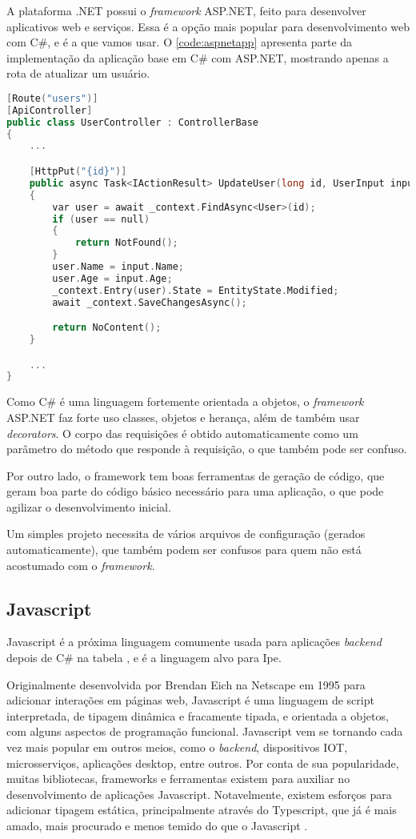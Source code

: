 A plataforma .NET possui o \textit{framework} ASP.NET, feito para desenvolver
aplicativos web e serviços. Essa é a opção mais popular para desenvolvimento web
com C\#, e é a que vamos usar. O \autoref{code:aspnetapp} apresenta parte da implementação
da aplicação base em C\# com ASP.NET, mostrando apenas a rota de atualizar um
usuário.

\begin{lstlisting}[language=C++,label={code:aspnetapp},caption={Aplicação base em C\# com ASP.NET}]
[Route("users")]
[ApiController]
public class UserController : ControllerBase
{
    ...

    [HttpPut("{id}")]
    public async Task<IActionResult> UpdateUser(long id, UserInput input)
    {
        var user = await _context.FindAsync<User>(id);
        if (user == null)
        {
            return NotFound();
        }
        user.Name = input.Name;
        user.Age = input.Age;
        _context.Entry(user).State = EntityState.Modified;
        await _context.SaveChangesAsync();

        return NoContent();
    }

    ...
}
\end{lstlisting}

Como C\# é uma linguagem fortemente orientada a objetos, o \textit{framework} ASP.NET
faz forte uso classes, objetos e herança, além de também usar \textit{decorators}.
O corpo das requisições é obtido automaticamente como um parâmetro do método que
responde à requisição, o que também pode ser confuso.

Por outro lado, o framework tem boas ferramentas de geração de código, que geram
boa parte do código básico necessário para uma aplicação, o que pode agilizar o
desenvolvimento inicial.

Um simples projeto necessita de vários arquivos de configuração (gerados automaticamente),
que também podem ser confusos para quem não está acostumado com o \textit{framework}.


\subsection{Javascript}\label{subsec:js}

Javascript é a próxima linguagem comumente usada para aplicações \textit{backend}
depois de C\# na tabela \textcite{tiobeindex}, e é a linguagem alvo para Ipe.

Originalmente desenvolvida por Brendan Eich na Netscape em 1995 para adicionar
interações em páginas web, Javascript é uma linguagem de script interpretada, de
tipagem dinâmica e fracamente tipada, e orientada a objetos, com alguns aspectos
de programação funcional. Javascript vem se tornando cada vez mais popular em
outros meios, como o \textit{backend}, dispositivos IOT, microsserviços, aplicações
desktop, entre outros. Por conta de sua popularidade, muitas bibliotecas, frameworks
e ferramentas existem para auxiliar no desenvolvimento de aplicações Javascript.
Notavelmente, existem esforços para adicionar tipagem estática, principalmente
através do Typescript, que já é mais amado, mais procurado e menos temido do que
o Javascript \textcite{stackoverflowsurvey}.

